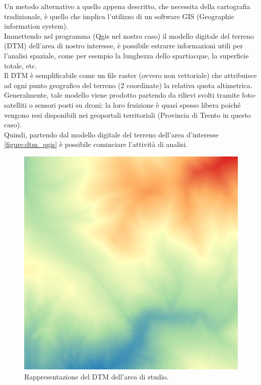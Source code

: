 Un metodo alternativo a quello appena descritto, che necessita della cartografia tradizionale, è quello che implica l'utilizzo di un software GIS (Geographic information system).\\
Immettendo nel programma (Qgis nel nostro caso) il modello digitale del terreno (DTM) dell'area di nostro interesse, è possibile estrarre informazioni utili per l'analisi spaziale, come per esempio la lunghezza dello spartiacque, la superficie totale, etc.\\
Il DTM è semplificabile come un file raster (ovvero non vettoriale) che attribuisce ad ogni punto geografico del terreno (2 coordinate) la relativa quota altimetrica. Generalmente, tale modello viene prodotto partendo da rilievi svolti tramite foto-satelliti o sensori posti su droni; la loro fruizione è quasi spesso libera poiché vengono resi disponibili nei geoportali territoriali (Provincia di Trento in questo caso).\\
Quindi, partendo dal modello digitale del terreno dell'area d'interesse \eqref{figure:dtm_qgis} è possibile cominciare l'attività di analisi.\\
\begin{figure}[hbt]\centering
    \includegraphics[scale=.50]{immagini/dtm_qgis.PNG}
    \caption{Rappresentazione del DTM dell'area di studio.}
    \label{figure:dtm_qgis}
\end{figure}
